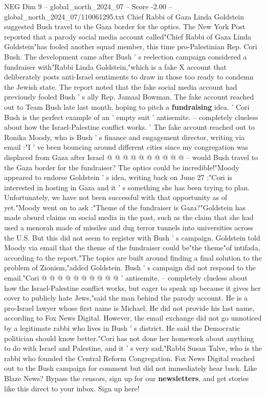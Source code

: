 \begin{textsample}{NEG Dim 9 – global\_north\_2024\_07 – Score -2.00 – global\_north\_2024\_07/110061295.txt}  \label{ex:f9_neg_139}
Chief Rabbi of Gaza Linda Goldstein suggested Bush travel to the Gaza border for the optics.
The New York Post reported that a parody social media account called"Chief Rabbi of Gaza Linda Goldstein"has fooled another squad member, this time pro-Palestinian Rep.
Cori Bush.
The development came after Bush ' s reelection campaign considered a fundraiser with"Rabbi Linda Goldstein,"which is a fake X account that deliberately posts anti-Israel sentiments to draw in those too ready to condemn the Jewish state.
The report noted that the fake social media account had previously fooled Bush ' s ally Rep.
Jamaal Bowman.
The fake account reached out to Team Bush late last month, hoping to pitch a \textbf{fundraising} idea. ' Cori Bush is the perfect example of an ' empty suit ' antisemite. -- completely clueless about how the Israel-Palestine conflict works. ' The fake account reached out to Ronika Moody, who is Bush ' s finance and engagement director, writing via email :"I ' ve been bouncing around different cities since my congregation was displaced from Gaza after Israel @ @ @ @ @ @ @ @ @ @ -- would Bush travel to the Gaza border for the fundraiser?
The optics could be incredible!"Moody appeared to endorse Goldstein ' s idea, writing back on June 27 :"Cori is interested in hosting in Gaza and it ' s something she has been trying to plan.
Unfortunately, we have not been successful with that opportunity as of yet."Moody went on to ask :"Theme of the fundraiser is Gaza?"Goldstein has made absurd claims on social media in the past, such as the claim that she had used a menorah made of missiles and dug terror tunnels into universities across the U.S.
But this did not seem to register with Bush ' s campaign.
Goldstein told Moody via email that the theme of the fundraiser could be"the theme"of intifada, according to the report."The topics are built around finding a final solution to the problem of Zionism,"added Goldstein.
Bush ' s campaign did not respond to the email."Cori @ @ @ @ @ @ @ @ @ @ ' antisemite. -- completely clueless about how the Israel-Palestine conflict works, but eager to speak up because it gives her cover to publicly hate Jews,"said the man behind the parody account.
He is a pro-Israel lawyer whose first name is Michael.
He did not provide his last name, according to Fox News Digital.
However, the email exchange did not go unnoticed by a legitimate rabbi who lives in Bush ' s district.
He said the Democratic politician should know better."Cori has not done her homework about anything to do with Israel and Palestine, and it ' s very sad,"Rabbi Susan Talve, who is the rabbi who founded the Central Reform Congregation.
Fox News Digital reached out to the Bush campaign for comment but did not immediately hear back.
Like Blaze News?
Bypass the censors, sign up for our \textbf{newsletters}, and get stories like this direct to your inbox.
Sign up here!

\end{textsample}
